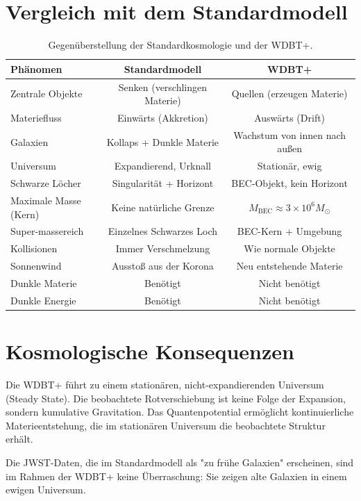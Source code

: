 \documentclass[12pt,a4paper]{article}
\begin{document}
\section{Vergleich mit dem Standardmodell}

\begin{table}[h]
\centering
\begin{tabular}{|l|c|c|}
\hline
\textbf{Phänomen} & \textbf{Standardmodell} & \textbf{WDBT+} \\
\hline
Zentrale Objekte & Senken (verschlingen Materie) & Quellen (erzeugen Materie) \\
Materiefluss & Einwärts (Akkretion) & Auswärts (Drift) \\
Galaxien & Kollaps + Dunkle Materie & Wachstum von innen nach außen \\
Universum & Expandierend, Urknall & Stationär, ewig \\
Schwarze Löcher & Singularität + Horizont & BEC-Objekt, kein Horizont \\
Maximale Masse (Kern) & Keine natürliche Grenze & $M_{\text{BEC}} \approx 3 \times 10^6 M_\odot$ \\
Super-massereich & Einzelnes Schwarzes Loch & BEC-Kern + Umgebung \\
Kollisionen & Immer Verschmelzung & Wie normale Objekte \\
Sonnenwind & Ausstoß aus der Korona & Neu entstehende Materie \\
Dunkle Materie & Benötigt & Nicht benötigt \\
Dunkle Energie & Benötigt & Nicht benötigt \\
\hline
\end{tabular}
\caption{Gegenüberstellung der Standardkosmologie und der WDBT+.}
\end{table}

\section{Kosmologische Konsequenzen}

Die WDBT+ führt zu einem stationären, nicht-expandierenden Universum (Steady State). Die beobachtete Rotverschiebung ist keine Folge der Expansion, sondern kumulative Gravitation. Das Quantenpotential ermöglicht kontinuierliche Materieentstehung, die im stationären Universum die beobachtete Struktur erhält.

Die JWST-Daten, die im Standardmodell als "zu frühe Galaxien" erscheinen, sind im Rahmen der WDBT+ keine Überraschung: Sie zeigen alte Galaxien in einem ewigen Universum.
\end{document}
